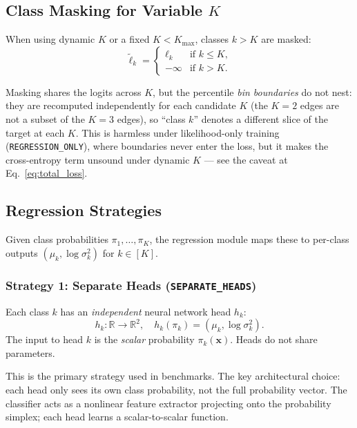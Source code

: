 \documentclass[11pt,a4paper]{article}
\theoremstyle{definition}
\newcommand{\R}{\mathbb{R}}
\newcommand{\bx}{\mathbf{x}}
\begin{document}
\subsection{Class Masking for Variable $K$}

When using dynamic $K$ or a fixed $K < K_{\max}$, classes $k > K$ are masked:
\[
  \tilde{\ell}_k =
  \begin{cases}
    \ell_k & \text{if } k \leq K, \\
    -\infty & \text{if } k > K.
  \end{cases}
\]

\begin{implnote}
Masking shares the logits across $K$, but the percentile \emph{bin boundaries} do not nest:
they are recomputed independently for each candidate $K$ (the $K{=}2$ edges are not a subset of
the $K{=}3$ edges), so ``class $k$'' denotes a different slice of the target at each $K$. This
is harmless under likelihood-only training (\texttt{REGRESSION\_ONLY}), where boundaries never
enter the loss, but it makes the cross-entropy term unsound under dynamic $K$ — see the caveat
at Eq.~\eqref{eq:total_loss}.
\end{implnote}

\subsection{Regression Strategies}
\label{sec:reg_strategies}

Given class probabilities $\pi_1, \ldots, \pi_K$, the regression module
maps these to per-class outputs $(\mu_k, \log\sigma_k^2)$ for $k \in [K]$.

\subsubsection{Strategy 1: Separate Heads (\texttt{SEPARATE\_HEADS})}

Each class $k$ has an \emph{independent} neural network head $h_k$:
\[
  h_k : \R \to \R^2, \quad h_k(\pi_k) = (\mu_k, \log\sigma_k^2).
\]
The input to head $k$ is the \emph{scalar} probability $\pi_k(\bx)$.
Heads do not share parameters.

\begin{implnote}
This is the primary strategy used in benchmarks. The key architectural choice:
each head only sees its own class probability, not the full probability vector.
The classifier acts as a nonlinear feature extractor projecting onto the
probability simplex; each head learns a scalar-to-scalar function.
\end{implnote}
\end{document}
